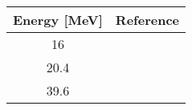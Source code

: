\begin{tabular}{c c} 
    \toprule 
    \bf{Energy [MeV]} & \bf{Reference} \\
    \midrule
    16 & \cite{Abbott87}\\
    20.4 & \cite{Wassenaar89}\\
    39.6 & \cite{Boyd68}\\
    \bottomrule
\end{tabular}
